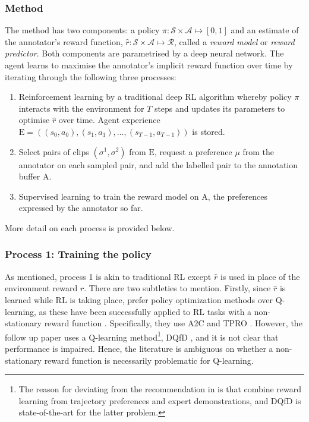 \documentclass[11pt, a4paper, bibliography=totoc]{report}
\newcommand{\rp}{\hat{r}}
\newcommand{\expbuff}{\mathrm{E}}
\newcommand{\annbuff}{\mathrm{A}}
\begin{document}
\subsubsection{Method}
The method has two components: a policy $ \pi : \mathcal{S} \times \mathcal{A} \mapsto [0,1] $ and an estimate of the annotator's reward function, $ \rp : \mathcal{S} \times \mathcal{A} \mapsto \mathcal{R} $, called a \textit{reward model} or \textit{reward predictor}. Both components are parametrised by a deep neural network. The agent learns to maximise the annotator's implicit reward function over time by iterating through the following three processes:
\begin{enumerate}
	\item Reinforcement learning by a traditional deep RL algorithm whereby policy $ \pi $ interacts with the environment for $ T $ steps and updates its parameters to optimise $ \rp $ over time. Agent experience $ \expbuff = ((s_0, a_0), (s_1, a_1),\dots, (s_{T-1}, a_{T-1}) ) $ is stored.
	\item Select pairs of clips $ (\sigma^1, \sigma^2) $ from $ \expbuff $, request a preference $ \mu $ from the annotator on each sampled pair, and add the labelled pair to the annotation buffer $ \annbuff $.
	\item Supervised learning to train the reward model on $ \annbuff $, the preferences expressed by the annotator so far.
\end{enumerate}
More detail on each process is provided below.

\subsubsection{Process 1: Training the policy}
As mentioned, process 1 is akin to traditional RL except $ \rp $ is used in place of the environment reward $ r $. There are two subtleties to mention. Firstly, since $ \rp $ is learned while RL is taking place, \cite{Christiano2017} prefer policy optimization methods over Q-learning, as these have been successfully applied to RL tasks with a non-stationary reward function \cite{Ho2016}. Specifically, they use A2C \cite{Mnih2016} and TPRO \cite{Schulman2015}. However, the follow up paper \cite{Ibarz2018} uses a Q-learning method\footnote{The reason for deviating from the recommendation in \cite{Christiano2017} is that \cite{Ibarz2018} combine reward learning from trajectory preferences and expert demonstrations, and DQfD is state-of-the-art for the latter problem.}, DQfD \cite{Hester2017}, and it is not clear that performance is impaired. Hence, the literature is ambiguous on whether a non-stationary reward function is necessarily problematic for Q-learning. %
\end{document}
